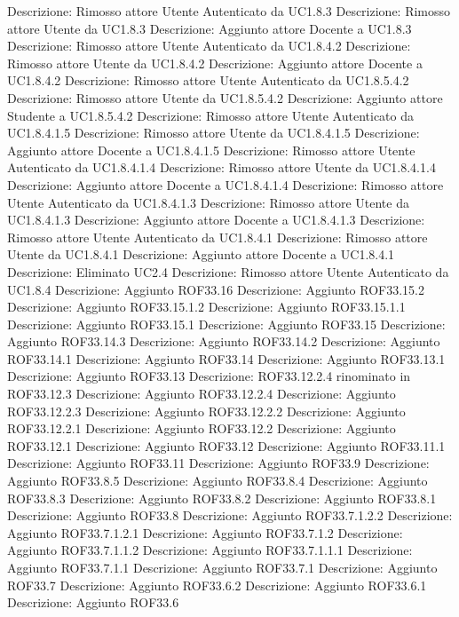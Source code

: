 Descrizione: Rimosso attore Utente Autenticato da UC1.8.3 
Descrizione: Rimosso attore Utente da UC1.8.3 
Descrizione: Aggiunto attore Docente a UC1.8.3 
Descrizione: Rimosso attore Utente Autenticato da UC1.8.4.2 
Descrizione: Rimosso attore Utente da UC1.8.4.2 
Descrizione: Aggiunto attore Docente a UC1.8.4.2 
Descrizione: Rimosso attore Utente Autenticato da UC1.8.5.4.2 
Descrizione: Rimosso attore Utente da UC1.8.5.4.2 
Descrizione: Aggiunto attore Studente a UC1.8.5.4.2 
Descrizione: Rimosso attore Utente Autenticato da UC1.8.4.1.5 
Descrizione: Rimosso attore Utente da UC1.8.4.1.5 
Descrizione: Aggiunto attore Docente a UC1.8.4.1.5 
Descrizione: Rimosso attore Utente Autenticato da UC1.8.4.1.4 
Descrizione: Rimosso attore Utente da UC1.8.4.1.4 
Descrizione: Aggiunto attore Docente a UC1.8.4.1.4 
Descrizione: Rimosso attore Utente Autenticato da UC1.8.4.1.3 
Descrizione: Rimosso attore Utente da UC1.8.4.1.3 
Descrizione: Aggiunto attore Docente a UC1.8.4.1.3 
Descrizione: Rimosso attore Utente Autenticato da UC1.8.4.1 
Descrizione: Rimosso attore Utente da UC1.8.4.1 
Descrizione: Aggiunto attore Docente a UC1.8.4.1 
Descrizione: Eliminato UC2.4 
Descrizione: Rimosso attore Utente Autenticato da UC1.8.4 
Descrizione: Aggiunto ROF33.16 
Descrizione: Aggiunto ROF33.15.2 
Descrizione: Aggiunto ROF33.15.1.2 
Descrizione: Aggiunto ROF33.15.1.1 
Descrizione: Aggiunto ROF33.15.1 
Descrizione: Aggiunto ROF33.15 
Descrizione: Aggiunto ROF33.14.3 
Descrizione: Aggiunto ROF33.14.2 
Descrizione: Aggiunto ROF33.14.1 
Descrizione: Aggiunto ROF33.14 
Descrizione: Aggiunto ROF33.13.1 
Descrizione: Aggiunto ROF33.13 
Descrizione: ROF33.12.2.4 rinominato in ROF33.12.3 
Descrizione: Aggiunto ROF33.12.2.4 
Descrizione: Aggiunto ROF33.12.2.3 
Descrizione: Aggiunto ROF33.12.2.2 
Descrizione: Aggiunto ROF33.12.2.1 
Descrizione: Aggiunto ROF33.12.2 
Descrizione: Aggiunto ROF33.12.1 
Descrizione: Aggiunto ROF33.12 
Descrizione: Aggiunto ROF33.11.1 
Descrizione: Aggiunto ROF33.11 
Descrizione: Aggiunto ROF33.9 
Descrizione: Aggiunto ROF33.8.5 
Descrizione: Aggiunto ROF33.8.4 
Descrizione: Aggiunto ROF33.8.3 
Descrizione: Aggiunto ROF33.8.2 
Descrizione: Aggiunto ROF33.8.1 
Descrizione: Aggiunto ROF33.8 
Descrizione: Aggiunto ROF33.7.1.2.2 
Descrizione: Aggiunto ROF33.7.1.2.1 
Descrizione: Aggiunto ROF33.7.1.2 
Descrizione: Aggiunto ROF33.7.1.1.2 
Descrizione: Aggiunto ROF33.7.1.1.1 
Descrizione: Aggiunto ROF33.7.1.1 
Descrizione: Aggiunto ROF33.7.1 
Descrizione: Aggiunto ROF33.7 
Descrizione: Aggiunto ROF33.6.2 
Descrizione: Aggiunto ROF33.6.1 
Descrizione: Aggiunto ROF33.6 
